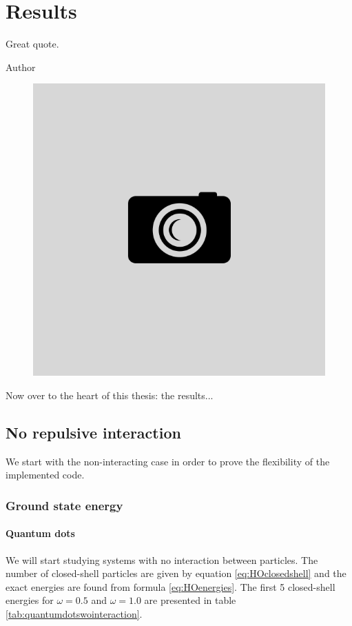 \chapter{Results} \label{sec:results}
\epigraph{Great quote.}{Author}
\begin{figure}[H]
	\centering
	\includegraphics[scale=0.4]{Images/example.png}
	\caption{}
\end{figure}
Now over to the heart of this thesis: the results...

\newpage
\section{No repulsive interaction}
We start with the non-interacting case in order to prove the flexibility of the implemented code. 

\subsection{Ground state energy}
\subsubsection{Quantum dots}
We will start studying systems with no interaction between particles. The number of closed-shell particles are given by equation \eqref{eq:HOclosedshell} and the exact energies are found from formula \eqref{eq:HOenergies}. The first 5 closed-shell energies for $\omega=0.5$ and $\omega=1.0$ are presented in table \eqref{tab:quantumdotswointeraction}.

